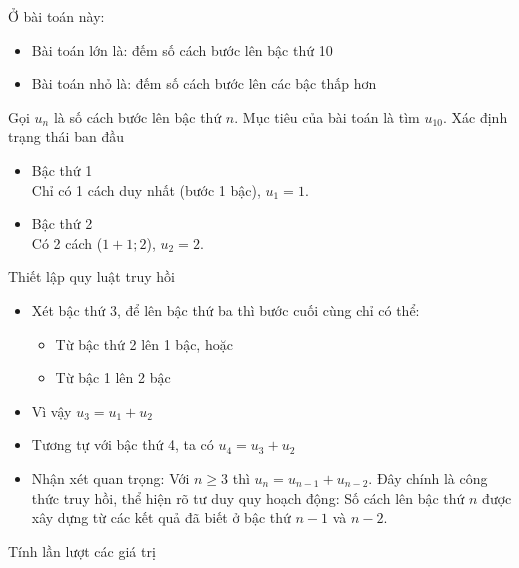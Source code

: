\documentclass[12pt, a4paper]{article}
\begin{document}
		\noindent Ở bài toán này:
		\begin{itemize}
			\item Bài toán lớn là: đếm số cách bước lên bậc thứ 10
			\item Bài toán nhỏ là: đếm số cách bước lên các bậc thấp hơn
		\end{itemize}
		
		\vspace{0.3cm}
		
		
		\vspace{0.2cm}
		
		\noindent Gọi \(u_n\) là số cách bước lên bậc thứ \(n\). Mục tiêu của bài toán là tìm \(u_{10}\).
		Xác định trạng thái ban đầu
		\begin{itemize}
			\item Bậc thứ 1 \\
			Chỉ có 1 cách duy nhất (bước 1 bậc), \(u_1 = 1\).
			\item Bậc thứ 2 \\
			Có 2 cách (\(1 + 1; 2\)), \(u_2 = 2\).
		\end{itemize}
		
		\vspace{0.3cm}
		
		\noindent Thiết lập quy luật truy hồi
		\begin{itemize}
			\item Xét bậc thứ 3, để lên bậc thứ ba thì bước cuối cùng chỉ có thể:
			\begin{itemize}
				\item Từ bậc thứ 2 lên 1 bậc, hoặc
				\item Từ bậc 1 lên 2 bậc
			\end{itemize}
			\item Vì vậy \(u_3 = u_1 + u_2\)
			\item Tương tự với bậc thứ 4, ta có \(u_4 = u_3 + u_2\)
			\item Nhận xét quan trọng: Với \(n \ge 3\) thì \(u_n = u_{n-1} + u_{n-2}\). Đây chính là công thức truy hồi, thể hiện rõ tư duy quy hoạch động: Số cách lên bậc thứ \(n\) được xây dựng từ các kết quả đã biết ở bậc thứ \(n-1\) và \(n-2\).
		\end{itemize}
		
		\vspace{0.3cm}
		
		\noindent Tính lần lượt các giá trị
		
		\vspace{0.3cm}
		
\end{document}
